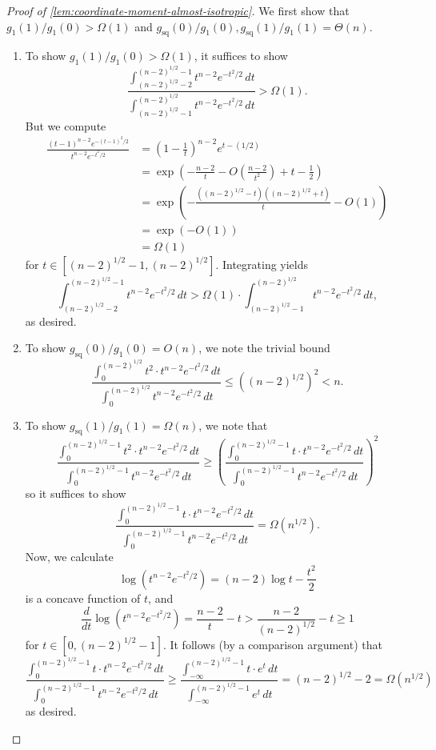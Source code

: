 \documentclass[11pt]{article}
\numberwithin{equation}{section}
\theoremstyle{definition}
\begin{document}
\begin{proof}[Proof of \cref{lem:coordinate-moment-almost-isotropic}]
We first show that $g_1(1)/g_1(0)>\Omega(1)$ and
$g_{\mathrm{sq}}(0)/g_1(0),g_{\mathrm{sq}}(1)/g_1(1)=\Theta(n)$.
\begin{enumerate}[label=(\roman*)]
\item To show $g_1(1)/g_1(0)>\Omega(1)$, it suffices to show
\[
\frac{\int_{(n-2)^{1/2}-2}^{(n-2)^{1/2}-1}t^{n-2}e^{-t^2/2}\,dt}
{\int_{(n-2)^{1/2}-1}^{(n-2)^{1/2}}t^{n-2}e^{-t^2/2}\,dt}>\Omega(1).
\]
But we compute
\begin{align*}
\frac{(t-1)^{n-2}e^{-(t-1)^2/2}}{t^{n-2}e^{-t^2/2}}
&=\left(1-\frac1t\right)^{n-2}e^{t-(1/2)}\\
&=\exp\left(-\frac{n-2}{t}-O\left(\frac{n-2}{t^2}\right)+t-\frac12\right)\\
&=\exp\left(-\frac{((n-2)^{1/2}-t)((n-2)^{1/2}+t)}{t}-O(1)\right)\\
&=\exp(-O(1))\\
&=\Omega(1)
\end{align*}
for $t\in[(n-2)^{1/2}-1,(n-2)^{1/2}]$.
Integrating yields
\[
\int_{(n-2)^{1/2}-2}^{(n-2)^{1/2}-1}t^{n-2}e^{-t^2/2}\,dt
>\Omega(1)\cdot\int_{(n-2)^{1/2}-1}^{(n-2)^{1/2}}t^{n-2}e^{-t^2/2}\,dt,
\]
as desired.

\item To show $g_{\mathrm{sq}}(0)/g_1(0)=O(n)$, we note the trivial bound
\[
\frac{\int_0^{(n-2)^{1/2}}t^2\cdot t^{n-2}e^{-t^2/2}\,dt} {\int_0^{(n-2)^{1/2}}t^{n-2}e^{-t^2/2}\,dt}
\le((n-2)^{1/2})^2
<n.
\]

\item To show $g_{\mathrm{sq}}(1)/g_1(1)=\Omega(n)$, we note that
\[
\frac{\int_0^{(n-2)^{1/2}-1}t^2\cdot t^{n-2}e^{-t^2/2}\,dt}
{\int_0^{(n-2)^{1/2}-1}t^{n-2}e^{-t^2/2}\,dt}
\ge
\left(
\frac{\int_0^{(n-2)^{1/2}-1}t\cdot t^{n-2}e^{-t^2/2}\,dt}
{\int_0^{(n-2)^{1/2}-1}t^{n-2}e^{-t^2/2}\,dt}
\right)^2
\]
so it suffices to show
\[
\frac{\int_0^{(n-2)^{1/2}-1}t\cdot t^{n-2}e^{-t^2/2}\,dt}
{\int_0^{(n-2)^{1/2}-1}t^{n-2}e^{-t^2/2}\,dt}=\Omega(n^{1/2}).
\]
Now, we calculate
\[
\log(t^{n-2}e^{-t^2/2})=(n-2)\log t-\frac{t^2}{2}
\]
is a concave function of $t$, and
\[
\frac{d}{dt}\log(t^{n-2}e^{-t^2/2})
=\frac{n-2}{t}-t
>\frac{n-2}{(n-2)^{1/2}}-t
\ge1
\]
for $t\in[0,(n-2)^{1/2}-1]$.
It follows (by a comparison argument) that
\[
\frac{\int_0^{(n-2)^{1/2}-1}t\cdot t^{n-2}e^{-t^2/2}\,dt} {\int_0^{(n-2)^{1/2}-1}t^{n-2}e^{-t^2/2}\,dt}
\ge \frac{\int_{-\infty}^{(n-2)^{1/2}-1}t\cdot e^t\,dt} {\int_{-\infty}^{(n-2)^{1/2}-1}e^t\,dt}
=(n-2)^{1/2}-2
=\Omega(n^{1/2})
\]
as desired.
\end{enumerate}


\end{proof}
\end{document}
